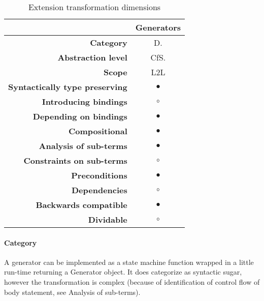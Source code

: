 \begin{table}[h]
\centering
\caption{Extension transformation dimensions}
\label{generators-table}
\begin{tabular}{@{}rc@{}}
\toprule
                                       & \multicolumn{1}{l}{\textbf{Generators}} \\ \midrule
\textbf{Category}                      & D.
\\
\textbf{Abstraction level}             & CfS.                          \\
\textbf{Scope}                         & L2L                               \\
\textbf{Syntactically type preserving} & $\bullet$                                          \\
\textbf{Introducing bindings}          & $\circ$                                          \\%
\textbf{Depending on bindings}         & $\bullet$                                           \\
\textbf{Compositional}                 & $\bullet$                                          \\
\textbf{Analysis of sub-terms}          & $\bullet$                                          \\
\textbf{Constraints on sub-terms}       & $\circ$                                           \\
\textbf{Preconditions}                 & $\bullet$                                          \\
\textbf{Dependencies}                  & $\circ$                                           \\
\textbf{Backwards compatible}          & $\bullet$                                          \\
\textbf{Dividable}                     & $\circ$                                           \\ \bottomrule
\end{tabular}
\end{table}

\paragraph{Category}
A generator can be implemented as a state machine function wrapped in a little run-time returning a Generator object. It does categorize as syntactic sugar, however the transformation is complex (because of identification of control flow of body statement, see Analysis of sub-terms). 

